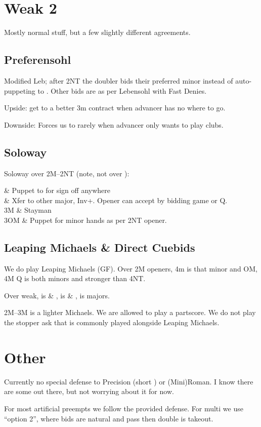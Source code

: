 \documentclass[tom-ari]{subfile}
\begin{document}
	\section{Weak 2}
	
	Mostly normal stuff, but a few slightly different agreements.
	
	\subsection{Preferensohl}
	
	Modified Leb; after 2NT the doubler bids their preferred minor instead of auto-puppeting to . Other bids are as per Lebensohl with Fast Denies.
	
	Upside: get to a better 3m contract when advancer has no where to go.
	
	Downside: Forces us to  rarely when advancer only wants to play clubs. 
	
	\subsection{Soloway}

	Soloway over 2M--2NT (note, not over ):
	
	\begin{bidtable}{}
		 & Puppet to  for sign off anywhere \\
		 & Xfer to other major, Inv+. Opener can accept by bidding game or Q. \\
		3M & Stayman \\
		3OM & Puppet for minor hands as per 2NT opener. \\
	\end{bidtable}

	\subsection{Leaping Michaels \& Direct Cuebids}
	
	We do play Leaping Michaels (GF). Over 2M openers, 4m is that minor and OM, 4M Q is both minors and stronger than 4NT. 
	
	Over  weak,  is \clubsuit \& \heartsuit,  is \clubsuit \& \spadesuit,  is majors.
	
	2M--3M is a lighter Michaels. We are allowed to play a partscore. We do not play the stopper ask that is commonly played alongside Leaping Michaels.
		
	\section{Other}
	
	Currently no special defense to  Precision (short \diamondsuit) or (Mini)Roman. I know there are some out there, but not worrying about it for now.
	
	For most artificial preempts we follow the provided defense. For multi we use ``option 2'', where bids are natural and pass then double is takeout.
	
\end{document}

